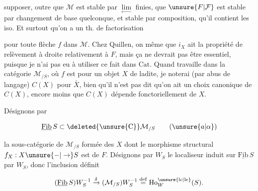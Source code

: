 
supposer, outre que $\mathcal M$ est stable par $\underset{\leftarrow}{\lim}$ finies, que $\unsure{F|\mathcal F}$ est stable par changement de base quelconque, et stable par composition, qu'il contient les iso. Et surtout qu'on a un th. de factorisation


pour toute flèche $f$ dans $\mathcal M$. Chez Quillen, on  même que $i_X$ ait la propriété de relèvement à droite  relativement à $F$, mais ça ne devrait pas être essentiel, puisque je n'ai pas eu à utiliser ce fait dans $\mathrm{Cat}$. Quand  travaille dans la catégorie $\mathcal M_{/S}$, où $f$ est  pour un objet $X$ de ladite, je noterai (par abus de langage) $C(X)$ pour $\bar X$, bien qu'il n'est pas dit qu'on ait un choix canonique de $C(X)$, encore moins que $C(X)$ dépende fonctoriellement de $X$.

Désignons par

\[
\underline{\mathrm{Fib}}\,S\subset\deleted{\unsure{\mathrm{C}}}\mathcal M_{/S}\tag*{(\ensuremath{\unsure{a|\alpha}})}
\]

la sous-catégorie de $\mathcal M_{/S}$ formée des $X$ dont le morphisme structural $f_X:X\unsure{-|\to}S$ est de $F$.  Désignons  par $W_S$ le localiseur induit sur $\underline{\mathrm{Fib}}\,S$ par $W_S$, donc l'inclusion  définit

\[
(\underline{\mathrm{Fib}}\,S)W_S^{-1}\xrightarrow{\delta}(\mathcal M_{/S})W_S^{-1}\overset{\mathrm{def}}{=}\mathrm{Ho}^{\unsure{\mathrm{lc}|\mathrm{le}}}_W(S).
\]
